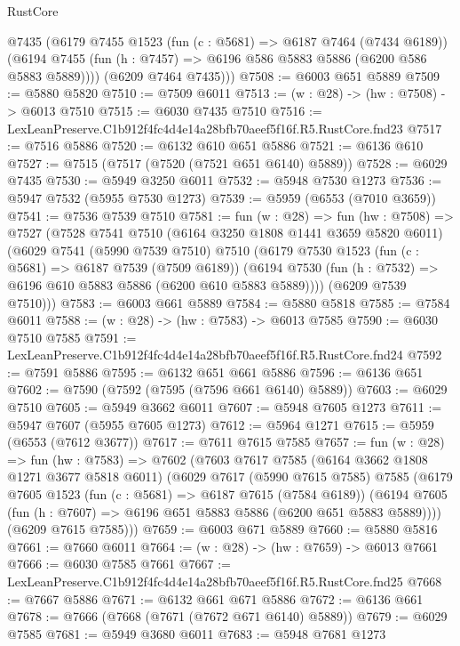 \begin{lexlean}{RustCore}
\begin{coremodule}
        @7435
        (@6179
          @7455
          @1523
          (fun (c : @5681) => @6187 @7464 (@7434 @6189))
          (@6194 @7455 (fun (h : @7457) => @6196 @586 @5883 @5886 (@6200 @586 @5883 @5889))))
        (@6209 @7464 @7435)))
@7508 := @6003 @651 @5889
@7509 := @5880 @5820
@7510 := @7509 @6011
@7513 := (w : @28) -> (hw : @7508) -> @6013 @7510
@7515 := @6030 @7435 @7510
@7516 := LexLeanPreserve.C1b912f4fc4d4e14a28bfb70aeef5f16f.R5.RustCore.fnd23
@7517 := @7516 @5886
@7520 := @6132 @610 @651 @5886
@7521 := @6136 @610
@7527 := @7515 (@7517 (@7520 (@7521 @651 @6140) @5889))
@7528 := @6029 @7435
@7530 := @5949 @3250 @6011
@7532 := @5948 @7530 @1273
@7536 := @5947 @7532 (@5955 @7530 @1273)
@7539 := @5959 (@6553 (@7010 @3659))
@7541 := @7536 @7539 @7510
@7581 := fun (w : @28) =>
  fun (hw : @7508) =>
  @7527
    (@7528
      @7541
      @7510
      (@6164 @3250 @1808 @1441 @3659 @5820 @6011)
      (@6029
        @7541
        (@5990 @7539 @7510)
        @7510
        (@6179
          @7530
          @1523
          (fun (c : @5681) => @6187 @7539 (@7509 @6189))
          (@6194 @7530 (fun (h : @7532) => @6196 @610 @5883 @5886 (@6200 @610 @5883 @5889))))
        (@6209 @7539 @7510)))
@7583 := @6003 @661 @5889
@7584 := @5880 @5818
@7585 := @7584 @6011
@7588 := (w : @28) -> (hw : @7583) -> @6013 @7585
@7590 := @6030 @7510 @7585
@7591 := LexLeanPreserve.C1b912f4fc4d4e14a28bfb70aeef5f16f.R5.RustCore.fnd24
@7592 := @7591 @5886
@7595 := @6132 @651 @661 @5886
@7596 := @6136 @651
@7602 := @7590 (@7592 (@7595 (@7596 @661 @6140) @5889))
@7603 := @6029 @7510
@7605 := @5949 @3662 @6011
@7607 := @5948 @7605 @1273
@7611 := @5947 @7607 (@5955 @7605 @1273)
@7612 := @5964 @1271
@7615 := @5959 (@6553 (@7612 @3677))
@7617 := @7611 @7615 @7585
@7657 := fun (w : @28) =>
  fun (hw : @7583) =>
  @7602
    (@7603
      @7617
      @7585
      (@6164 @3662 @1808 @1271 @3677 @5818 @6011)
      (@6029
        @7617
        (@5990 @7615 @7585)
        @7585
        (@6179
          @7605
          @1523
          (fun (c : @5681) => @6187 @7615 (@7584 @6189))
          (@6194 @7605 (fun (h : @7607) => @6196 @651 @5883 @5886 (@6200 @651 @5883 @5889))))
        (@6209 @7615 @7585)))
@7659 := @6003 @671 @5889
@7660 := @5880 @5816
@7661 := @7660 @6011
@7664 := (w : @28) -> (hw : @7659) -> @6013 @7661
@7666 := @6030 @7585 @7661
@7667 := LexLeanPreserve.C1b912f4fc4d4e14a28bfb70aeef5f16f.R5.RustCore.fnd25
@7668 := @7667 @5886
@7671 := @6132 @661 @671 @5886
@7672 := @6136 @661
@7678 := @7666 (@7668 (@7671 (@7672 @671 @6140) @5889))
@7679 := @6029 @7585
@7681 := @5949 @3680 @6011
@7683 := @5948 @7681 @1273

\end{coremodule}
\end{lexlean}
